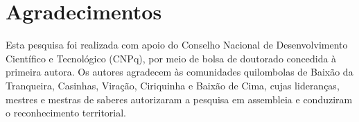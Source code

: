 \documentclass[preprint,authoryear,12pt]{elsarticle}
\begin{document}
\section*{Agradecimentos}

Esta pesquisa foi realizada com apoio do Conselho Nacional de Desenvolvimento Científico e Tecnológico (CNPq), por meio de bolsa de doutorado concedida à primeira autora. Os autores agradecem às comunidades quilombolas de Baixão da Tranqueira, Casinhas, Viração, Ciriquinha e Baixão de Cima, cujas lideranças, mestres e mestras de saberes autorizaram a pesquisa em assembleia e conduziram o reconhecimento territorial.




\appendix



\end{document}
